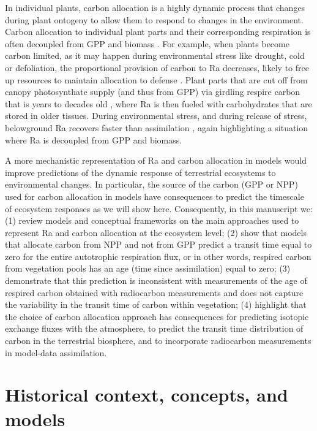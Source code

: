 \documentclass[bg, manuscript]{copernicus}
\begin{document}
In individual plants, carbon allocation is a highly dynamic process that changes during plant ontogeny to allow them to respond to changes in the environment. Carbon allocation to individual plant parts and their corresponding respiration is often decoupled from GPP and biomass \citep{Collalti2019}. For example, when plants become carbon limited, as it may happen during environmental stress like drought, cold or defoliation, the proportional provision of carbon to Ra decreases, likely to free up resources to maintain allocation to defense \citep{Huang2019EEB,Huang2019NP}. Plant parts that are cut off from canopy photosynthate supply (and thus from GPP) via girdling respire carbon that is years to decades old \citep{muhr:2013}, where Ra is then fueled with carbohydrates that are stored in older tissues. During environmental stress, and during release of stress, belowground Ra recovers faster than assimilation \citep{Hagedorn2016}, again highlighting a situation where Ra is decoupled from GPP and biomass.

A more mechanistic representation of Ra and carbon allocation in models would improve predictions of the dynamic response of terrestrial ecosystems to environmental changes. In particular, the source of the carbon (GPP or NPP) used for carbon allocation in models have consequences to predict the timescale of ecosystem responses as we will show here. 
Consequently, in this manuscript we: (1) review models and conceptual frameworks on the main approaches used to represent Ra and carbon allocation at the ecosystem level; (2) show that models that allocate carbon from NPP and not from GPP predict a transit time equal to zero for the entire autotrophic respiration flux, or in other words, respired carbon from vegetation pools has an age (time since assimilation) equal to zero; (3) demonstrate that this prediction is inconsistent with measurements of the age of respired carbon obtained with radiocarbon measurements and does not capture the variability in the transit time of carbon within vegetation; (4) highlight that the choice of carbon allocation approach has consequences for predicting isotopic exchange fluxes with the atmosphere, to predict the transit time distribution of carbon in the terrestrial biosphere, and to incorporate radiocarbon measurements in model-data assimilation. 

\section{Historical context, concepts, and models}
\end{document}
